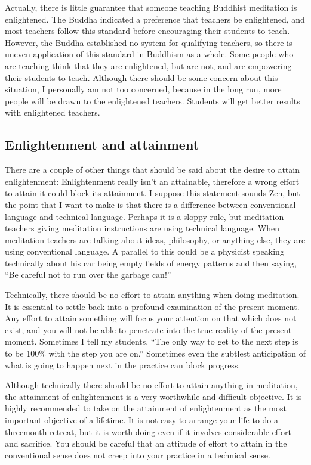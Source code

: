 \documentclass[a5paper,10pt,english]{book}
\begin{document}
\sphinxAtStartPar
Actually, there is little guarantee that someone teaching Buddhist
meditation is enlightened. The Buddha indicated a preference that
teachers be enlightened, and most teachers follow this standard before
encouraging their students to teach. However, the Buddha established no
system for qualifying teachers, so there is uneven application of this
standard in Buddhism as a whole. Some people who are teaching think that
they are enlightened, but are not, and are empowering their students to
teach. Although there should be some concern about this situation, I
personally am not too concerned, because in the long run, more people
will be drawn to the enlightened teachers. Students will get better
results with enlightened teachers.


\subsection{Enlightenment and attainment}
\label{\detokenize{saints:enlightenment-and-attainment}}
\sphinxAtStartPar
There are a couple of other things that should be said about the desire
to attain enlightenment: Enlightenment really isn’t an attainable,
therefore a wrong effort to attain it could block its attainment. I
suppose this statement sounds Zen, but the point that I want to make is
that there is a difference between conventional language and technical
language. Perhaps it is a sloppy rule, but meditation teachers giving
meditation instructions are using technical language. When meditation
teachers are talking about ideas, philosophy, or anything else, they are
using conventional language. A parallel to this could be a physicist
speaking technically about his car being empty fields of energy patterns
and then saying, “Be careful not to run over the garbage can!”

\sphinxAtStartPar
Technically, there should be no effort to attain anything when doing
 meditation. It is essential to settle back into a profound
examination of the present moment. Any effort to attain something will
focus your attention on that which does not exist, and you will not be
able to penetrate into the true reality of the present moment. Sometimes
I tell my students, “The only way to get to the next step is to be 100\%
with the step you are on.” Sometimes even the subtlest anticipation of
what is going to happen next in the practice can block progress.

\sphinxAtStartPar
Although technically there should be no effort to attain anything in
 meditation, the attainment of enlightenment is a very
worthwhile and difficult objective. It is highly recommended to take on
the attainment of enlightenment as the most important objective of a
lifetime. It is not easy to arrange your life to do a three\sphinxhyphen{}month
retreat, but it is worth doing even if it involves considerable effort
and sacrifice. You should be careful that an attitude of effort to
attain in the conventional sense does not creep into your practice in a
technical sense.
\end{document}

